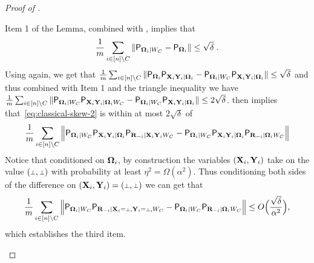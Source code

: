 \begin{proof}[Proof of ]
\begin{enumerate}
Item 1 of the Lemma, combined with , implies that 
\begin{equation}\label{eq:classical-skew-2bb}
\frac{1}{m} \sum_{i \in [n] \setminus C} \| \mathsf{P}_{{\boldsymbol{\Omega}}_i | W_C} - \mathsf{P}_{{\boldsymbol{\Omega}}_i}  \| \leq \sqrt{\delta}\;.
\end{equation}
Using  again, we get that $\frac{1}{m} \sum_{i \in [n] \setminus C} \| \mathsf{P}_{{\boldsymbol{\Omega}}_i } \mathsf{P}_{\mathbf{X}_i \mathbf{Y}_i | {\boldsymbol{\Omega}}_i} - \mathsf{P}_{{\boldsymbol{\Omega}}_i | W_C} \mathsf{P}_{\mathbf{X}_i \mathbf{Y}_i | {\boldsymbol{\Omega}}_i} \| \leq \sqrt{\delta}$ and thus combined with Item 1 and the triangle inequality we have $\frac{1}{m} \sum_{i \in [n] \setminus C} \| \mathsf{P}_{{\boldsymbol{\Omega}}_i | W_C} \mathsf{P}_{\mathbf{X}_i \mathbf{Y}_i | {\boldsymbol{\Omega}}_i W_C} - \mathsf{P}_{{\boldsymbol{\Omega}}_i | W_C} \mathsf{P}_{\mathbf{X}_i \mathbf{Y}_i | {\boldsymbol{\Omega}}_i} \| \leq 2\sqrt{\delta}$. 
 then implies that~\eqref{eq:classical-skew-2} is within at most $2\sqrt{\delta}$ of
\begin{equation}
\label{eq:classical-skew-2b}
\frac{1}{m} \sum_{i \in [n] \setminus C} \Big \| \mathsf{P}_{{\boldsymbol{\Omega}}_i |W_C} \mathsf{P}_{\mathbf{X}_i \mathbf{Y}_i | {\boldsymbol{\Omega}}_i} \mathsf{P}_{\mathbf{R}_{-i} | \mathbf{X}_i \mathbf{Y}_i W_C} - \mathsf{P}_{{\boldsymbol{\Omega}}_i | W_C} \mathsf{P}_{\mathbf{X}_i \mathbf{Y}_i | {\boldsymbol{\Omega}}_i} \mathsf{P}_{\mathbf{R}_{-i} |{\boldsymbol{\Omega}}_i  W_C}  \Big \|
\end{equation}
Notice that conditioned on ${\boldsymbol{\Omega}}_i$, by construction the variables $(\mathbf{X}_i,\mathbf{Y}_i)$ take on the value $(\dummy,\dummy)$ with probability at least $\eta^2 = \Omega(\alpha^2)$. Thus conditioning both sides of the difference on $(\bX_i,\bY_i) = (\dummy,\dummy)$ we can get that 
\begin{equation}
\label{eq:classical-skew-3}
\frac{1}{m} \sum_{i \in [n] \setminus C} \Big \| \P_{\bOmega_i |W_C} \P_{\bR_\mi | \bX_i = \dummy, \bY_i = \dummy, W_C} - \P_{\bOmega_i | W_C} \P_{\bR_\mi |\bOmega_i  W_C}  \Big \| \leq O \Big( \frac{\sqrt{\delta}}{\alpha^2} \Big),
\end{equation}
which establishes the third item.


\end{enumerate}
\end{proof}
